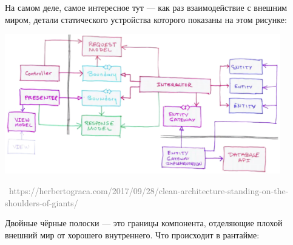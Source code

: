 \documentclass[a5paper]{article}
\newcommand{\attribution}[1] {
    \vspace{-4mm}\begin{flushright}\begin{scriptsize}\textcolor{gray}
    {\textcopyright\, #1}\end{scriptsize}\end{flushright}
}
\begin{document}
На самом деле, самое интересное тут --- как раз взаимодействие с внешним миром, детали статического устройства которого показаны на этом рисунке:

\begin{center}
    \includegraphics[width=0.9\textwidth]{cleanArchitectureControlFlow.png}
    \attribution{https://herbertograca.com/2017/09/28/clean-architecture-standing-on-the-shoulders-of-giants/}
\end{center}

Двойные чёрные полоски --- это границы компонента, отделяющие плохой внешний мир от хорошего внутреннего. Что происходит в рантайме:
\end{document}
